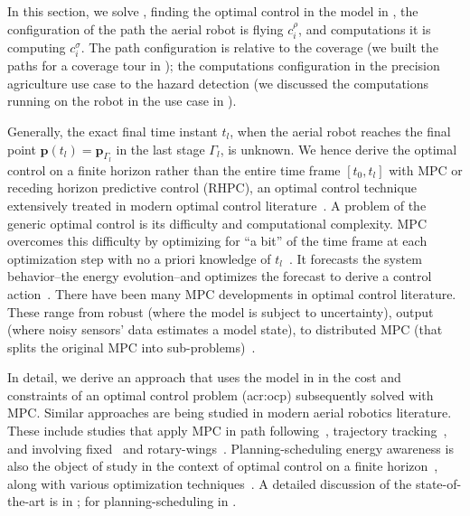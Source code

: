 In this section, we solve , finding the optimal control in the model in , the configuration of the path the aerial robot is flying $c_i^\rho$, and computations it is computing $c_i^\sigma$. The path configuration is relative to the coverage (we built the paths for a coverage tour in ); the computations configuration in the precision agriculture use case to the hazard detection (we discussed the computations running on the robot in the use case in ).

Generally, the exact final time instant $t_l$, when the aerial robot reaches the final point $\mathbf{p}(t_l)=\mathbf{p}_{\Gamma_l}$ in the last stage $\Gamma_l$, is unknown. We hence derive the optimal control on a finite horizon rather than the entire time frame $[t_0,t_l]$ with MPC or receding horizon predictive control (RHPC), an optimal control technique extensively treated in modern optimal control literature~\citep{rawlings2017model,wang2009model,camacho2007model,kwon2006receding,rossiter2004model}. A problem of the generic optimal control is its difficulty and computational complexity. MPC overcomes this difficulty by optimizing for ``a bit'' of the time frame at each optimization step with no a priori knowledge of $t_l$~\citep{camacho2007model}. It forecasts the system behavior--the energy evolution--and optimizes the forecast to derive a control action~\citep{rawlings2017model}. There have been many MPC developments in optimal control literature. These range from robust (where the model is subject to uncertainty), output (where noisy sensors' data estimates a model state), to distributed MPC (that splits the original MPC into sub-problems)~\citep{camacho2007model,rawlings2017model,kwon2006receding,rossiter2004model,wang2009model}.

In detail, we derive an approach that uses the model in  in the cost and constraints of an optimal control problem (\Gls{acr:ocp}) subsequently solved with MPC. Similar approaches are being studied in modern aerial robotics literature. These include studies that apply MPC in path following~\citep{gavilan2015iterative}, trajectory tracking~\citep{torrente2021data}, and involving fixed~\citep{kang2009linear,stastny2018nonlinear,chao2011collision,cavanini2021model} and rotary-wings~\citep{kostadinov2020online,song2020learning,bicego2020nonlinear}. Planning-scheduling energy awareness is also the object of study in the context of optimal control on a finite horizon~\citep{zhang2007low,ondruska2015scheduled}, along with various optimization techniques~\citep{lahijanian2018resource,brateman2006energy}. A detailed discussion of the state-of-the-art is in ; for planning-scheduling in .


